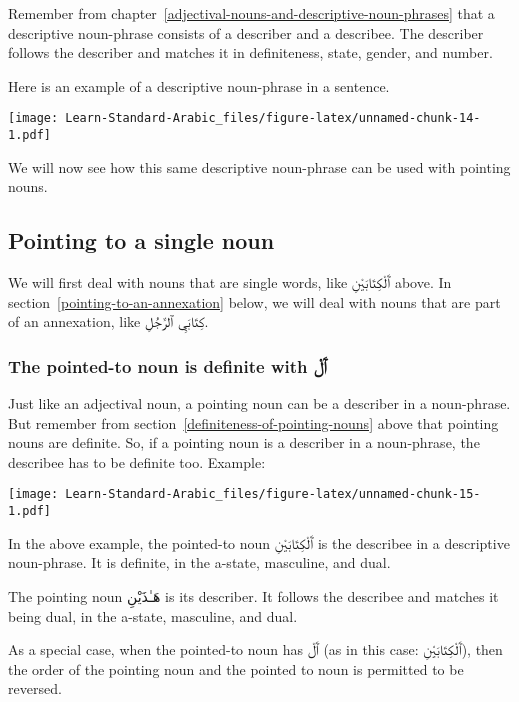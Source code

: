 \documentclass[
  10pt,
]{book}
\begin{document}
Remember from chapter~\ref{adjectival-nouns-and-descriptive-noun-phrases} that a descriptive noun-phrase consists of a describer and a describee. The describer follows the describer and matches it in definiteness, state, gender, and number.

Here is an example of a descriptive noun-phrase in a sentence.

\texttt{[image: Learn-Standard-Arabic\_files/figure-latex/unnamed-chunk-14-1.pdf]}

We will now see how this same descriptive noun-phrase can be used with pointing nouns.

\subsection{Pointing to a single noun}\label{pointing-to-a-single-noun}

We will first deal with nouns that are single words, like \foreignlanguage{arabic}{ٱَلْکِتَابَيْنِ} above.
In section~\ref{pointing-to-an-annexation}
below, we will deal with nouns that are part of an annexation, like \foreignlanguage{arabic}{کِتَابَيِ ٱلرَّجُلِ}.

\subsubsection{\texorpdfstring{The pointed-to noun is definite with \foreignlanguage{arabic}{ٱَلْ}}{The pointed-to noun is definite with ٱَلْ}}\label{phrase-single-pointed-to-noun-with-al}

Just like an adjectival noun, a pointing noun can be a describer in a noun-phrase. But remember from
section~\ref{definiteness-of-pointing-nouns}
above that pointing nouns are definite.
So, if a pointing noun is a describer in a noun-phrase, the describee has to be definite too.
Example:

\texttt{[image: Learn-Standard-Arabic\_files/figure-latex/unnamed-chunk-15-1.pdf]}

In the above example, the pointed-to noun \foreignlanguage{arabic}{ٱَلْکِتَابَيْنِ} is the describee in a descriptive noun-phrase. It is definite, in the a-state, masculine, and dual.

The pointing noun \foreignlanguage{arabic}{هَـٰذَيْنِ} is its describer. It follows the describee and matches it being dual, in the a-state, masculine, and dual.

As a special case, when the pointed-to noun has \foreignlanguage{arabic}{ٱَلْ} (as in this case: \foreignlanguage{arabic}{ٱَلْکِتَابَيْنِ}), then the order of the pointing noun and the pointed to noun is permitted to be reversed.
\end{document}

